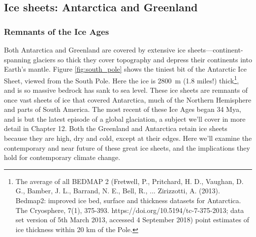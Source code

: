 \subsection{Ice sheets: Antarctica and Greenland}

\subsubsection{Remnants of the Ice Ages} Both Antarctica and Greenland are covered by extensive ice sheets---continent-spanning glaciers so thick they cover topography and depress their continents into Earth's mantle. Figure \ref{fig:south_pole} shows the tiniest bit of the Antarctic Ice Sheet, viewed from the South Pole. Here the ice is \SI{2800}{\metre} (1.8 miles!) thick\footnote{The average of all BEDMAP 2 (Fretwell, P., Pritchard, H. D., Vaughan, D. G., Bamber, J. L., Barrand, N. E., Bell, R., ... Zirizzotti, A. (2013). Bedmap2: improved ice bed, surface and thickness datasets for Antarctica. The Cryosphere, 7(1), 375-393. https://doi.org/10.5194/tc-7-375-2013; data set version of 5th March 2013, accessed 4 September 2018) point estimates of ice thickness within 20 km of the Pole.}, and is so massive bedrock has sank to sea level. These ice sheets are remnants of once vast sheets of ice that covered Antarctica, much of the Northern Hemisphere and parts of South America. The most recent of these Ice Ages began 34 Mya, and is but the latest episode of a global glaciation, a subject we'll cover in more detail in Chapter 12. Both the Greenland and Antarctica retain ice sheets because they are high, dry and cold, except at their edges. Here we'll examine the contemporary and near future of these great ice sheets, and the implications they hold for contemporary climate change.\\
